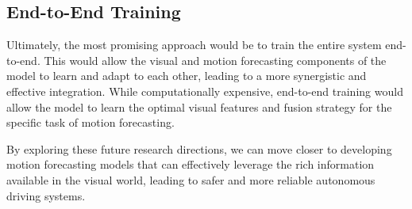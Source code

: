 \subsection{End-to-End Training}

Ultimately, the most promising approach would be to train the entire system end-to-end. This would allow the visual and motion forecasting components of the model to learn and adapt to each other, leading to a more synergistic and effective integration. While computationally expensive, end-to-end training would allow the model to learn the optimal visual features and fusion strategy for the specific task of motion forecasting.

By exploring these future research directions, we can move closer to developing motion forecasting models that can effectively leverage the rich information available in the visual world, leading to safer and more reliable autonomous driving systems.
